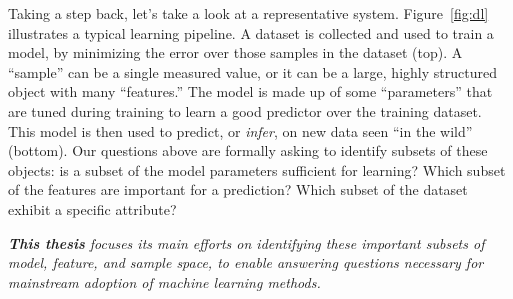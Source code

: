 Taking a step back, let's take a look at a representative system. Figure~\ref{fig:dl} illustrates a typical learning pipeline. 
A dataset is collected and used to train a model, by minimizing the error over
those samples in the dataset (top).
A ``sample'' can be a single measured value, or it can
be a large, highly structured object with many ``features.''
The model is made up of some ``parameters'' that are 
tuned during training to learn a good predictor over the training dataset.
This model is then used to predict, or \textit{infer}, on new
data seen ``in the wild'' (bottom).
Our questions above are formally asking to identify subsets of these objects: is a subset of the model parameters sufficient for learning? Which subset of the features are important for a prediction? Which subset of the dataset exhibit a specific attribute?


\begin{mdframed}[style=MyFrame]
\em 
\textbf{This thesis} focuses its main efforts on identifying these important subsets of model, feature, and sample space, to enable answering questions necessary for mainstream adoption of machine learning methods.
\end{mdframed}


